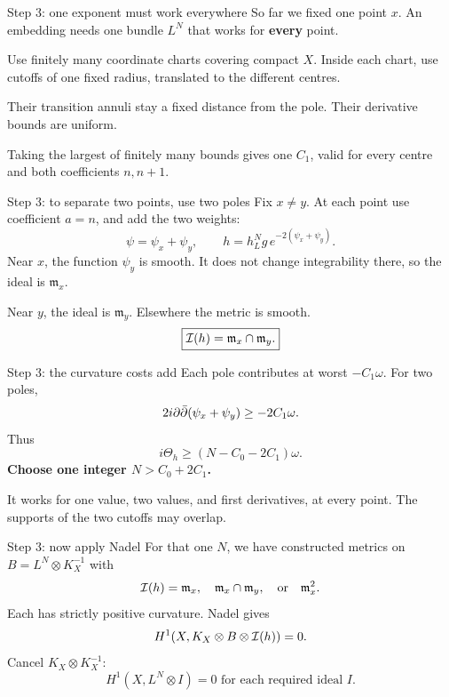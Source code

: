 \begin{frame}{Step 3: one exponent must work everywhere}
So far we fixed one point \(x\). An embedding needs one bundle \(L^N\) that works for \textbf{every} point.
\par\bigskip
Use finitely many coordinate charts covering compact \(X\). Inside each chart, use cutoffs of one fixed radius, translated to the different centres.
\par\bigskip
Their transition annuli stay a fixed distance from the pole. Their derivative bounds are uniform.
\par\medskip
Taking the largest of finitely many bounds gives one \(C_1\), valid for every centre and both coefficients \(n,n+1\).
\end{frame}

\begin{frame}{Step 3: to separate two points, use two poles}
Fix \(x\ne y\). At each point use coefficient \(a=n\), and add the two weights:
\[
\psi=\psi_x+\psi_y,\qquad
h=h_L^Ng\,e^{-2(\psi_x+\psi_y)}.
\]
Near \(x\), the function \(\psi_y\) is smooth. It does not change integrability there, so the ideal is \(\mathfrak m_x\).
\par\medskip
Near \(y\), the ideal is \(\mathfrak m_y\). Elsewhere the metric is smooth.
\[
\boxed{\mathcal I(h)=\mathfrak m_x\cap\mathfrak m_y.}
\]
\end{frame}

\begin{frame}{Step 3: the curvature costs add}
Each pole contributes at worst \(-C_1\omega\). For two poles,
\[
2i\partial\bar\partial(\psi_x+\psi_y)\ge-2C_1\omega.
\]
Thus
\[
i\Theta_h\ge(N-C_0-2C_1)\omega.
\]
\textbf{Choose one integer \(N>C_0+2C_1\).}
\par\medskip
It works for one value, two values, and first derivatives, at every point.
The supports of the two cutoffs may overlap.
\end{frame}

\begin{frame}{Step 3: now apply Nadel}
For that one \(N\), we have constructed metrics on \(B=L^N\otimes K_X^{-1}\) with
\[
\mathcal I(h)=\mathfrak m_x,\quad\mathfrak m_x\cap\mathfrak m_y,
\quad\text{or}\quad\mathfrak m_x^2.
\]
Each has strictly positive curvature. Nadel gives
\[
H^1(X,K_X\otimes B\otimes\mathcal I(h))=0.
\]
Cancel \(K_X\otimes K_X^{-1}\):
\[
\boxed{H^1(X,L^N\otimes I)=0\text{ for each required ideal }I.}
\]
\end{frame}

